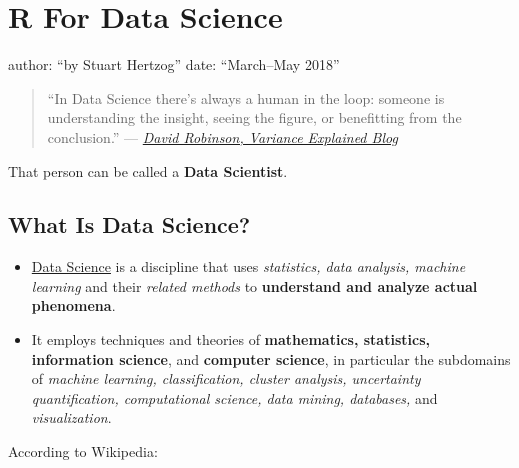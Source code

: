 \documentclass[]{book}
\theoremstyle{definition}
\theoremstyle{definition}
\theoremstyle{definition}
\theoremstyle{remark}
\begin{document}
\hypertarget{r-for-data-science}{%
\chapter{R For Data Science}\label{r-for-data-science}}

author: ``by Stuart Hertzog'' date: ``March--May 2018''

\begin{quote}
``In Data Science there's always a human in the loop: someone is
understanding the insight, seeing the figure, or benefitting from the
conclusion.'' ---
\href{http://varianceexplained.org/r/ds-ml-ai/}{\emph{David Robinson,
Variance Explained Blog}}
\end{quote}

That person can be called a \textbf{Data Scientist}.

\hypertarget{what-is-data-science}{%
\section{What Is Data Science?}\label{what-is-data-science}}

\begin{itemize}
\item
  \href{https://en.wikipedia.org/wiki/Data_science}{Data Science} is a
  discipline that uses \emph{statistics, data analysis, machine
  learning} and their \emph{related methods} to \textbf{understand and
  analyze actual phenomena}.
\item
  It employs techniques and theories of \textbf{mathematics, statistics,
  information science}, and \textbf{computer science}, in particular the
  subdomains of \emph{machine learning, classification, cluster
  analysis, uncertainty quantification, computational science, data
  mining, databases,} and \emph{visualization}.
\end{itemize}

According to Wikipedia:
\end{document}

